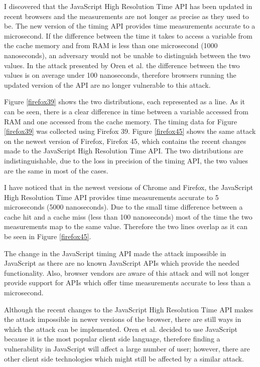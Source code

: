 \documentclass[10pt,a4paper,twoside]{book}
\begin{document}
I discovered that the JavaScript High Resolution Time API has been updated in recent browsers and the measurements are not longer as precise as they used to be. The new version of the timing API provides time measurements accurate to a microsecond. If the difference between the time it takes to access a variable from the cache memory and from RAM is less than one microsecond (1000 nanoseconds), an adversary would not be unable to distinguish between the two values. In the attack presented by Oren et al. \cite{oren2015spy} the difference between the two values is on average under 100 nanoseconds, therefore browsers running the updated version of the API are no longer vulnerable to this attack. 

Figure \ref{firefox39} shows the two distributions, each represented as a line. As it can be seen, there is a clear difference in time between a variable accessed from RAM and one accessed from the cache memory. The timing data for Figure \ref{firefox39} was collected using Firefox 39. Figure \ref{firefox45} shows the same attack on the newest version of Firefox, Firefox 45, which contains the recent changes made to the JavaScript High Resolution Time API. The two distributions are indistinguishable, due to the loss in precision of the timing API, the two values are the same in most of the cases.

I have noticed that in the newest versions of Chrome and Firefox, the JavaScript High Resolution Time API provides time measurements accurate to 5 microseconds (5000 nanoseconds). Due to the small time difference between a cache hit and a cache miss (less than 100 nanoseconds) most of the time the two measurements map to the same value. Therefore the two lines overlap as it can be seen in Figure \ref{firefox45}.
 
The change in the JavaScript timing API made the attack impossible in JavaScript as there are no known JavaScript APIs which provide the needed functionality. Also, browser vendors are aware of this attack and will not longer provide support for APIs which offer time measurements accurate to less than a microsecond. 

Although the recent changes to the JavaScript High Resolution Time API makes the attack impossible in newer versions of the browser, there are still ways in which the attack can be implemented. Oren et al. decided to use JavaScript because it is the most popular client side language, therefore finding a vulnerability in JavaScript will affect a large number of user; however, there are other client side technologies which might still be affected by a similar attack. 
\end{document}
